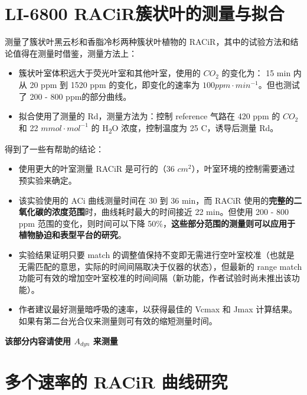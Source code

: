 \documentclass[
]{krantz}
\begin{document}
\cleardoublepage

\hypertarget{racir-conifer}{%
\section{\texorpdfstring{LI-6800 RACiR\texttrademark 簇状叶的测量与拟合}{LI-6800 RACiR簇状叶的测量与拟合}}\label{racir-conifer}}

\citet{Coursolle12019} 测量了簇状叶黑云杉和香脂冷杉两种簇状叶植物的 RACiR，其中的试验方法和结论值得在测量时借鉴，测量方法上：

\begin{itemize}
\item
  簇状叶室体积远大于荧光叶室和其他叶室，使用的 \(CO_2\) 的变化为： 15 min 内从 20 ppm 到 1520 ppm 的变化，即变化的速率为 \(100 ppm \cdot min^{-1}\)。但也测试了 200 - 800 ppm的部分曲线。
\item
  拟合使用了测量的 Rd，测量方法为：控制 reference 气路在 420 ppm 的 \(CO_2\) 和 22 \(mmol \cdot mol^{-1}\) 的 H\textsubscript{2}O 浓度，控制温度为 25 C，诱导后测量 Rd。
\end{itemize}

得到了一些有帮助的结论：

\begin{itemize}
\item
  使用更大的叶室测量 RACiR 是可行的（36 \(cm^2\)），叶室环境的控制需要通过预实验来确定。
\item
  该实验使用的 ACi 曲线测量时间在 30 到 36 min，而 RACiR 使用的\textbf{完整的二氧化碳的浓度范围}时，曲线耗时最大的时间接近 22 min。但使用 200 - 800 ppm 范围的变化，则时间可以下降 50\%，\textbf{这些部分范围的测量则可以应用于植物胁迫和表型平台的研究}。
\item
  实验结果证明只要 match 的调整值保持不变即无需进行空叶室校准（也就是无需匹配的意思，实际的时间间隔取决于仪器的状态），但最新的 range match 功能可有效的增加空叶室校准的时间间隔（新功能，作者试验时尚未推出该功能）。
\item
  作者建议最好测量暗呼吸的速率，以获得最佳的 Vcmax 和 Jmax 计算结果。如果有第二台光合仪来测量则可有效的缩短测量时间。
\end{itemize}

\textbf{该部分内容请使用 \(A_{dyn}\) 来测量}

\cleardoublepage

\hypertarget{multi1}{%
\section{多个速率的 RACiR 曲线研究}\label{multi1}}
\end{document}
